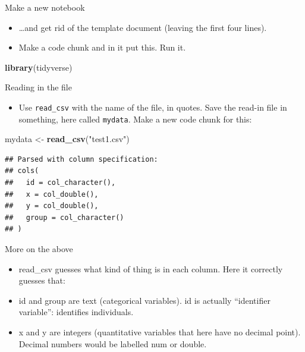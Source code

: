 \documentclass[ignorenonframetext,]{beamer}
\newenvironment{Shaded}{\begin{snugshade}}{\end{snugshade}}
\newcommand{\KeywordTok}[1]{\textcolor[rgb]{0.13,0.29,0.53}{\textbf{#1}}}
\newcommand{\NormalTok}[1]{#1}
\newcommand{\StringTok}[1]{\textcolor[rgb]{0.31,0.60,0.02}{#1}}
\providecommand{\tightlist}{%
  \setlength{\itemsep}{0pt}\setlength{\parskip}{0pt}}
\begin{document}
\begin{frame}[fragile]{Make a new notebook}
\protect\hypertarget{make-a-new-notebook}{}

\begin{itemize}
\tightlist
\item
  \ldots{}and get rid of the template document (leaving the first four
  lines).
\item
  Make a code chunk and in it put this. Run it.
\end{itemize}

\begin{Shaded}
\begin{Highlighting}[]
\KeywordTok{library}\NormalTok{(tidyverse)}
\end{Highlighting}
\end{Shaded}

\end{frame}

\begin{frame}[fragile]{Reading in the file}
\protect\hypertarget{reading-in-the-file}{}

\begin{itemize}
\tightlist
\item
  Use \texttt{read\_csv} with the name of the file, in quotes. Save the
  read-in file in something, here called \texttt{mydata}. Make a new
  code chunk for this:
\end{itemize}

\begin{Shaded}
\begin{Highlighting}[]
\NormalTok{mydata <-}\StringTok{ }\KeywordTok{read_csv}\NormalTok{(}\StringTok{"test1.csv"}\NormalTok{)}
\end{Highlighting}
\end{Shaded}

\begin{verbatim}
## Parsed with column specification:
## cols(
##   id = col_character(),
##   x = col_double(),
##   y = col_double(),
##   group = col_character()
## )
\end{verbatim}

\end{frame}

\begin{frame}{More on the above}
\protect\hypertarget{more-on-the-above}{}

\begin{itemize}
\tightlist
\item
  read\_csv guesses what kind of thing is in each column. Here it
  correctly guesses that:
\item
  id and group are text (categorical variables). id is actually
  ``identifier variable'': identifies individuals.
\item
  x and y are integers (quantitative variables that here have no decimal
  point). Decimal numbers would be labelled num or double.
\end{itemize}

\end{frame}
\end{document}
